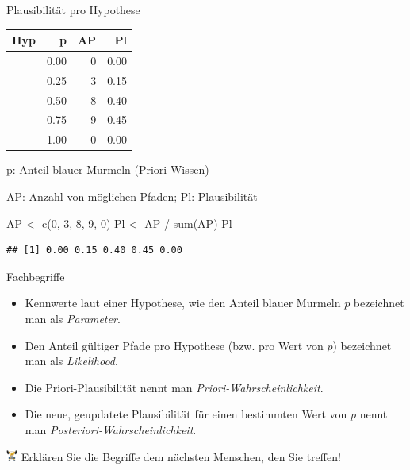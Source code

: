 \documentclass[
  ngerman,
  ignorenonframetext,
]{beamer}
\newenvironment{Shaded}{\begin{snugshade}}{\end{snugshade}}
\newcommand{\DecValTok}[1]{\textcolor[rgb]{0.00,0.00,0.81}{#1}}
\newcommand{\FunctionTok}[1]{\textcolor[rgb]{0.00,0.00,0.00}{#1}}
\newcommand{\NormalTok}[1]{#1}
\newcommand{\OtherTok}[1]{\textcolor[rgb]{0.56,0.35,0.01}{#1}}
\newcommand{\SpecialCharTok}[1]{\textcolor[rgb]{0.00,0.00,0.00}{#1}}
\begin{document}
\begin{frame}[fragile]{Plausibilität pro Hypothese}
\protect\hypertarget{plausibilituxe4t-pro-hypothese}{}
\begin{tabular}{l|r|r|r}
\hline
Hyp & p & AP & Pl\\
\hline
[W W W W] & 0.00 & 0 & 0.00\\
\hline
[B W W W] & 0.25 & 3 & 0.15\\
\hline
[B B W W] & 0.50 & 8 & 0.40\\
\hline
[B B B W] & 0.75 & 9 & 0.45\\
\hline
[B B B B] & 1.00 & 0 & 0.00\\
\hline
\end{tabular}

p: Anteil blauer Murmeln (Priori-Wissen)

AP: Anzahl von möglichen Pfaden; Pl: Plausibilität

\begin{Shaded}
\begin{Highlighting}[]
\NormalTok{AP }\OtherTok{\textless{}{-}} \FunctionTok{c}\NormalTok{(}\DecValTok{0}\NormalTok{, }\DecValTok{3}\NormalTok{, }\DecValTok{8}\NormalTok{, }\DecValTok{9}\NormalTok{, }\DecValTok{0}\NormalTok{)}
\NormalTok{Pl }\OtherTok{\textless{}{-}}\NormalTok{ AP }\SpecialCharTok{/} \FunctionTok{sum}\NormalTok{(AP)}
\NormalTok{Pl}
\end{Highlighting}
\end{Shaded}

\begin{verbatim}
## [1] 0.00 0.15 0.40 0.45 0.00
\end{verbatim}
\end{frame}

\begin{frame}{Fachbegriffe}
\protect\hypertarget{fachbegriffe}{}
\begin{itemize}
\item
  Kennwerte laut einer Hypothese, wie den Anteil blauer Murmeln \(p\)
  bezeichnet man als \emph{Parameter}.
\item
  Den Anteil gültiger Pfade pro Hypothese (bzw. pro Wert von \(p\))
  bezeichnet man als \emph{Likelihood}.
\item
  Die Priori-Plausibilität nennt man \emph{Priori-Wahrscheinlichkeit}.
\item
  Die neue, geupdatete Plausibilität für einen bestimmten Wert von \(p\)
  nennt man \emph{Posteriori-Wahrscheinlichkeit}.
\end{itemize}

\includegraphics[width=1em]{../img/weight.pdf} Erklären Sie die Begriffe
dem nächsten Menschen, den Sie treffen!
\end{frame}
\end{document}
